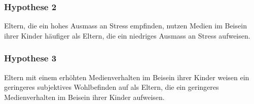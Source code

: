\subsubsection{Hypothese 2}
Eltern, die ein hohes Ausmass an Stress empfinden, nutzen Medien im Beisein ihrer Kinder häufiger als Eltern, die ein niedriges Ausmass an Stress aufweisen.
\subsubsection{Hypothese 3}
Eltern mit einem erhöhten Medienverhalten im Beisein ihrer Kinder weisen ein geringeres subjektives Wohlbefinden auf als Eltern, die ein geringeres Medienverhalten im Beisein ihrer Kinder aufweisen.

